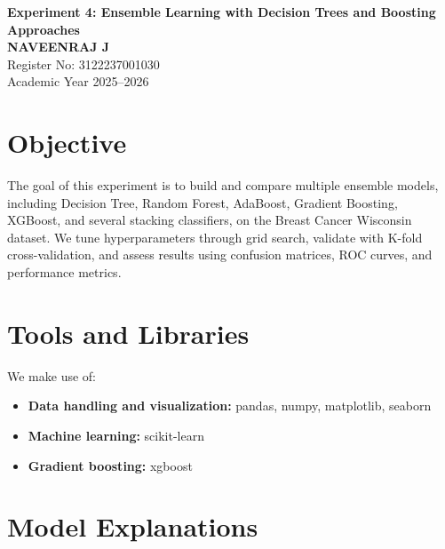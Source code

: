 \documentclass[12pt,a4paper]{article}
\begin{document}
\begin{center}
    \LARGE \textbf{Experiment 4: Ensemble Learning with Decision Trees and Boosting Approaches} \\[1em]
    \large \textbf{NAVEENRAJ J} \\
    Register No: 3122237001030 \\
    Academic Year 2025--2026
\end{center}

\vspace{1cm}

\section*{Objective}
The goal of this experiment is to build and compare multiple ensemble models, including Decision Tree, Random Forest, AdaBoost, Gradient Boosting, XGBoost, and several stacking classifiers, on the Breast Cancer Wisconsin dataset. We tune hyperparameters through grid search, validate with K-fold cross-validation, and assess results using confusion matrices, ROC curves, and performance metrics.

\section*{Tools and Libraries}
We make use of:
\begin{itemize}
    \item \textbf{Data handling and visualization:} pandas, numpy, matplotlib, seaborn
    \item \textbf{Machine learning:} scikit-learn
    \item \textbf{Gradient boosting:} xgboost
\end{itemize}

\section*{Model Explanations}
\end{document}
